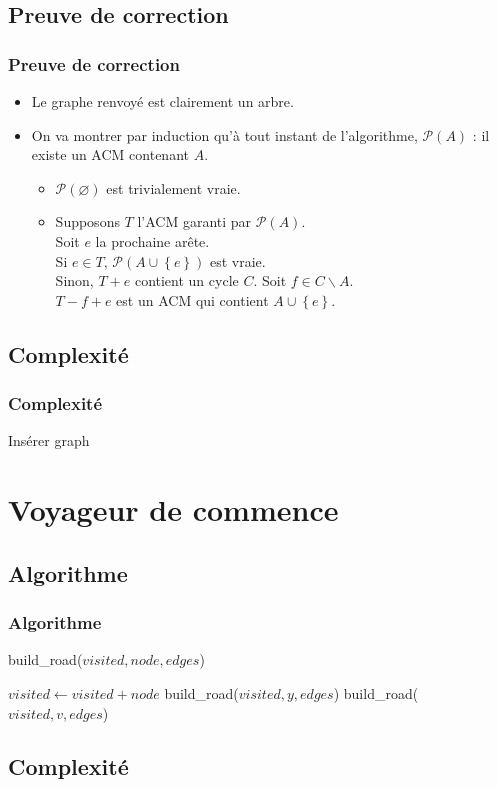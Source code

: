 \documentclass{beamer}
\begin{document}
	\subsection{Preuve de correction}
		\begin{frame}
			\frametitle{Preuve de correction}
			
			\begin{itemize}
				\item Le graphe renvoyé est clairement un arbre.
				\item On va montrer par induction qu'à tout instant de
					l'algorithme, $\mathcal{P}(A)$ : il existe un ACM
					contenant $A$. 
					\begin{itemize}
						\item $\mathcal{P}(\varnothing)$ est trivialement
							vraie.
						\item Supposons $T$ l'ACM garanti par
							$\mathcal{P}(A)$.\\
							Soit $e$ la prochaine arête.\\
							Si $e \in T$,
							$\mathcal{P}(A\cup\left\{e\right\})$
							est vraie.\\
							Sinon, $T+e$ contient un cycle $C$. Soit $f
							\in C \backslash A$.\\
							$T-f+e$ est un ACM qui contient
							$A\cup\left\{e\right\}$.
					\end{itemize}
			\end{itemize}
		\end{frame}
	\subsection{Complexité}
		\begin{frame}
			\frametitle{Complexité}
			
			Insérer graph
		\end{frame}
	\section{Voyageur de commence}

	\subsection{Algorithme}
		\begin{frame}
			\frametitle{Algorithme}
			
			\begin{algorithm}[H]
				\caption{build\_road($visited, node, edges$)}
				\begin{algorithmic}[H]
					\STATE $visited \leftarrow visited + node$
						\STATE build\_road($visited, y, edges$)
						\ELSE {}
						\STATE build\_road($visited, v, edges$)
						\ENDIF
						\ENDIF
					\ENDFOR
				\end{algorithmic}
			\end{algorithm}
			
		\end{frame}

	\subsection{Complexité}
\end{document}
